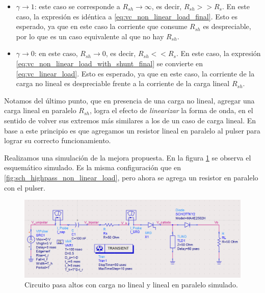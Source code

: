 \begin{itemize}
    \item $\gamma \to 1$: este caso se corresponde a $R_{sh} \to \infty$, es
        decir, $R_{sh} >> R_s$. En este caso, la expresión es idéntica a
        \ref{eq:vc_non_linear_load_final}. Esto es esperado, ya que en este caso
        la corriente que consume $R_{sh}$ es despreciable, por lo que es un caso
        equivalente al que no hay $R_{sh}$.
    \item $\gamma \to 0$: en este caso, $R_{sh} \to 0$, es decir, $R_{sh} <<
        R_s$. En este caso, la expresión
        \ref{eq:vc_non_linear_load_with_shunt_final} se convierte en
        \ref{eq:vc_linear_load}. Esto es esperado, ya que en este caso, la
        corriente de la carga no lineal es despreciable frente a la corriente
        de la carga lineal $R_{sh}$.
\end{itemize}

Notamos del último punto, que en presencia de una carga no lineal, agregar una
carga lineal en paralelo $R_{sh}$, logra el efecto de \textit{linearizar} la
forma de onda, en el sentido de volver sus extremos más similares a los de un
caso de carga lineal.  En base a este principio es que agregamos un resistor
lineal en paralelo al pulser para lograr su correcto funcionamiento.

Realizamos una simulación de la mejora propuesta. En la figura
\ref{fig:sch_highpass_non_linear_w_shunt_simulation} se observa el esquemático
simulado. Es la misma configuración que en
\ref{fig:sch_highpass_non_linear_load}, pero ahora se  agrega un resistor en
paralelo con el pulser.

\begin{figure}[tbp]
    \centering
    \includegraphics[width=\textwidth]{images/highpass_nonlinear_w_shunt_sch.png}
    \caption{Circuito pasa altos con carga no lineal y lineal en paralelo
    simulado.}
    \label{fig:sch_highpass_non_linear_w_shunt_simulation}
\end{figure}

